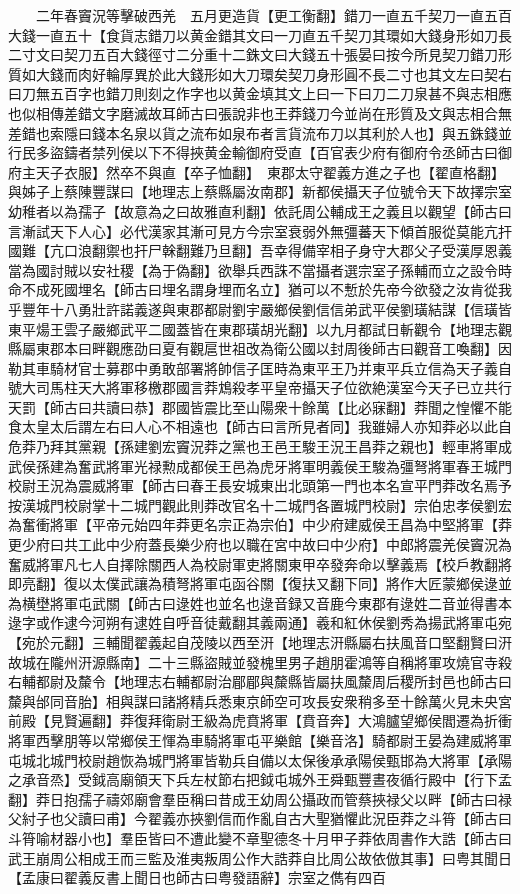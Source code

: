 　　二年春竇況等擊破西羌　五月更造貨【更工衡翻】錯刀一直五千契刀一直五百大錢一直五十【食貨志錯刀以黄金錯其文曰一刀直五千契刀其環如大錢身形如刀長二寸文曰契刀五百大錢徑寸二分重十二銖文曰大錢五十張晏曰按今所見契刀錯刀形質如大錢而肉好輪厚異於此大錢形如大刀環矣契刀身形圓不長二寸也其文左曰契右曰刀無五百字也錯刀則刻之作字也以黄金填其文上曰一下曰刀二刀泉甚不與志相應也似相傳差錯文字磨滅故耳師古曰張說非也王莽錢刀今並尚在形質及文與志相合無差錯也索隱曰錢本名泉以貨之流布如泉布者言貨流布刀以其利於人也】與五銖錢並行民多盜鑄者禁列侯以下不得挾黄金輸御府受直【百官表少府有御府令丞師古曰御府主天子衣服】然卒不與直【卒子恤翻】　東郡太守翟義方進之子也【翟直格翻】與姊子上蔡陳豐謀曰【地理志上蔡縣屬汝南郡】新都侯攝天子位號令天下故擇宗室幼稚者以為孺子【故意為之曰故雅直利翻】依託周公輔成王之義且以觀望【師古曰言漸試天下人心】必代漢家其漸可見方今宗室衰弱外無彊蕃天下傾首服從莫能亢扞國難【亢口浪翻禦也扞尸榦翻難乃旦翻】吾幸得備宰相子身守大郡父子受漢厚恩義當為國討賊以安社稷【為于偽翻】欲舉兵西誅不當攝者選宗室子孫輔而立之設令時命不成死國埋名【師古曰埋名謂身埋而名立】猶可以不慙於先帝今欲發之汝肯從我乎豐年十八勇壯許諾義遂與東郡都尉劉宇嚴鄉侯劉信信弟武平侯劉璜結謀【信璜皆東平煬王雲子嚴鄉武平二國蓋皆在東郡璜胡光翻】以九月都試日斬觀令【地理志觀縣屬東郡本曰畔觀應劭曰夏有觀扈世祖改為衛公國以封周後師古曰觀音工喚翻】因勒其車騎材官士募郡中勇敢部署將帥信子匡時為東平王乃并東平兵立信為天子義自號大司馬柱天大將軍移檄郡國言莽鴆殺孝平皇帝攝天子位欲絶漢室今天子已立共行天罰【師古曰共讀曰恭】郡國皆震比至山陽衆十餘萬【比必寐翻】莽聞之惶懼不能食太皇太后謂左右曰人心不相遠也【師古曰言所見者同】我雖婦人亦知莽必以此自危莽乃拜其黨親【孫建劉宏竇況莽之黨也王邑王駿王況王昌莽之親也】輕車將軍成武侯孫建為奮武將軍光禄勲成都侯王邑為虎牙將軍明義侯王駿為彊弩將軍春王城門校尉王況為震威將軍【師古曰春王長安城東出北頭第一門也本名宣平門莽改名焉予按漢城門校尉掌十二城門觀此則莽改官名十二城門各置城門校尉】宗伯忠孝侯劉宏為奮衝將軍【平帝元始四年莽更名宗正為宗伯】中少府建威侯王昌為中堅將軍【莽更少府曰共工此中少府蓋長樂少府也以職在宮中故曰中少府】中郎將震羌侯竇況為奮威將軍凡七人自擇除關西人為校尉軍吏將關東甲卒發奔命以擊義焉【校戶教翻將即亮翻】復以太僕武讓為積弩將軍屯函谷關【復扶又翻下同】將作大匠蒙鄉侯逯並為横壄將軍屯武關【師古曰逯姓也並名也逯音録又音鹿今東郡有逯姓二音並得書本逯字或作逮今河朔有逮姓自呼音徒戴翻其義兩通】羲和紅休侯劉秀為揚武將軍屯宛【宛於元翻】三輔聞翟義起自茂陵以西至汧【地理志汧縣屬右扶風音口堅翻賢曰汧故城在隴州汧源縣南】二十三縣盜賊並發槐里男子趙朋霍鴻等自稱將軍攻燒官寺殺右輔都尉及斄令【地理志右輔都尉治郿郿與斄縣皆屬扶風斄周后稷所封邑也師古曰斄與邰同音胎】相與謀曰諸將精兵悉東京師空可攻長安衆稍多至十餘萬火見未央宮前殿【見賢遍翻】莽復拜衛尉王級為虎賁將軍【賁音奔】大鴻臚望鄉侯閻遷為折衝將軍西擊朋等以常鄉侯王惲為車騎將軍屯平樂館【樂音洛】騎都尉王晏為建威將軍屯城北城門校尉趙恢為城門將軍皆勒兵自備以太保後承承陽侯甄邯為大將軍【承陽之承音烝】受鉞高廟領天下兵左杖節右把鉞屯城外王舜甄豐晝夜循行殿中【行下孟翻】莽日抱孺子禱郊廟會羣臣稱曰昔成王幼周公攝政而管蔡挾禄父以畔【師古曰禄父紂子也父讀曰甫】今翟義亦挾劉信而作亂自古大聖猶懼此況臣莽之斗筲【師古曰斗筲喻材器小也】羣臣皆曰不遭此變不章聖德冬十月甲子莽依周書作大誥【師古曰武王崩周公相成王而三監及淮夷叛周公作大誥莽自比周公故依倣其事】曰粤其聞日【孟康曰翟義反書上聞日也師古曰粤發語辭】宗室之儁有四百